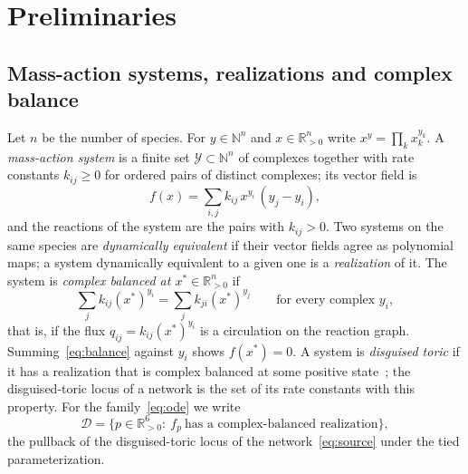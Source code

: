 \documentclass[11pt,a4paper]{article}
\theoremstyle{plain}
\theoremstyle{definition}
\theoremstyle{remark}
\newcommand{\R}{\mathbb{R}}
\newcommand{\N}{\mathbb{N}}
\newcommand{\Rp}{\R_{>0}}
\newcommand{\DT}{\mathcal{D}}
\newcommand{\xs}{x^{*}}
\begin{document}
\section{Preliminaries}\label{sec:prelim}

\subsection{Mass-action systems, realizations and complex balance}

Let $n$ be the number of species. For $y\in\N^n$ and $x\in\Rp^n$ write $x^y=\prod_kx_k^{y_k}$. A \emph{mass-action system} is a finite set $\mathcal Y\subset\N^n$ of complexes together with rate constants $k_{ij}\ge0$ for ordered pairs of distinct complexes; its vector field is
\begin{equation}\label{eq:field}
f(x)=\sum_{i,j}k_{ij}\,x^{y_i}\,(y_j-y_i),
\end{equation}
and the reactions of the system are the pairs with $k_{ij}>0$. Two systems on the same species are \emph{dynamically equivalent} if their vector fields agree as polynomial maps; a system dynamically equivalent to a given one is a \emph{realization} of it. The system is \emph{complex balanced at $\xs\in\Rp^n$} if
\begin{equation}\label{eq:balance}
\sum_jk_{ij}(\xs)^{y_i}=\sum_jk_{ji}(\xs)^{y_j}\qquad\text{for every complex }y_i,
\end{equation}
that is, if the flux $q_{ij}=k_{ij}(\xs)^{y_i}$ is a circulation on the reaction graph. Summing~\eqref{eq:balance} against $y_i$ shows $f(\xs)=0$. A system is \emph{disguised toric} if it has a realization that is complex balanced at some positive state~\cite{BrustengaCraciunSorea2022}; the disguised-toric locus of a network is the set of its rate constants with this property. For the family~\eqref{eq:ode} we write
\[
\DT=\{p\in\Rp^6:\ f_p\ \text{has a complex-balanced realization}\},
\]
the pullback of the disguised-toric locus of the network~\eqref{eq:source} under the tied parameterization.
\end{document}
